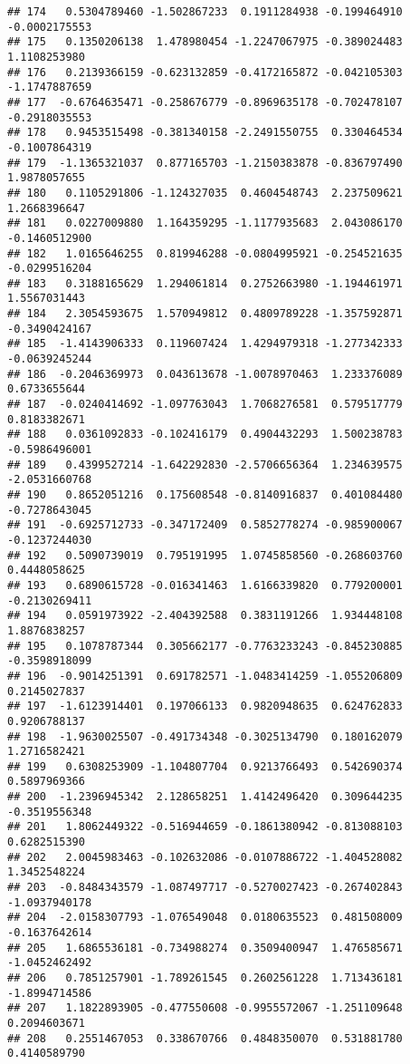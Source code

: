\documentclass[
]{article}
\begin{document}
\begin{verbatim}
## 174   0.5304789460 -1.502867233  0.1911284938 -0.199464910 -0.0002175553
## 175   0.1350206138  1.478980454 -1.2247067975 -0.389024483  1.1108253980
## 176   0.2139366159 -0.623132859 -0.4172165872 -0.042105303 -1.1747887659
## 177  -0.6764635471 -0.258676779 -0.8969635178 -0.702478107 -0.2918035553
## 178   0.9453515498 -0.381340158 -2.2491550755  0.330464534 -0.1007864319
## 179  -1.1365321037  0.877165703 -1.2150383878 -0.836797490  1.9878057655
## 180   0.1105291806 -1.124327035  0.4604548743  2.237509621  1.2668396647
## 181   0.0227009880  1.164359295 -1.1177935683  2.043086170 -0.1460512900
## 182   1.0165646255  0.819946288 -0.0804995921 -0.254521635 -0.0299516204
## 183   0.3188165629  1.294061814  0.2752663980 -1.194461971  1.5567031443
## 184   2.3054593675  1.570949812  0.4809789228 -1.357592871 -0.3490424167
## 185  -1.4143906333  0.119607424  1.4294979318 -1.277342333 -0.0639245244
## 186  -0.2046369973  0.043613678 -1.0078970463  1.233376089  0.6733655644
## 187  -0.0240414692 -1.097763043  1.7068276581  0.579517779  0.8183382671
## 188   0.0361092833 -0.102416179  0.4904432293  1.500238783 -0.5986496001
## 189   0.4399527214 -1.642292830 -2.5706656364  1.234639575 -2.0531660768
## 190   0.8652051216  0.175608548 -0.8140916837  0.401084480 -0.7278643045
## 191  -0.6925712733 -0.347172409  0.5852778274 -0.985900067 -0.1237244030
## 192   0.5090739019  0.795191995  1.0745858560 -0.268603760  0.4448058625
## 193   0.6890615728 -0.016341463  1.6166339820  0.779200001 -0.2130269411
## 194   0.0591973922 -2.404392588  0.3831191266  1.934448108  1.8876838257
## 195   0.1078787344  0.305662177 -0.7763233243 -0.845230885 -0.3598918099
## 196  -0.9014251391  0.691782571 -1.0483414259 -1.055206809  0.2145027837
## 197  -1.6123914401  0.197066133  0.9820948635  0.624762833  0.9206788137
## 198  -1.9630025507 -0.491734348 -0.3025134790  0.180162079  1.2716582421
## 199   0.6308253909 -1.104807704  0.9213766493  0.542690374  0.5897969366
## 200  -1.2396945342  2.128658251  1.4142496420  0.309644235 -0.3519556348
## 201   1.8062449322 -0.516944659 -0.1861380942 -0.813088103  0.6282515390
## 202   2.0045983463 -0.102632086 -0.0107886722 -1.404528082  1.3452548224
## 203  -0.8484343579 -1.087497717 -0.5270027423 -0.267402843 -1.0937940178
## 204  -2.0158307793 -1.076549048  0.0180635523  0.481508009 -0.1637642614
## 205   1.6865536181 -0.734988274  0.3509400947  1.476585671 -1.0452462492
## 206   0.7851257901 -1.789261545  0.2602561228  1.713436181 -1.8994714586
## 207   1.1822893905 -0.477550608 -0.9955572067 -1.251109648  0.2094603671
## 208   0.2551467053  0.338670766  0.4848350070  0.531881780  0.4140589790

\end{verbatim}
\end{document}
